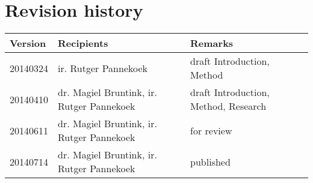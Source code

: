 \chapter*{Revision history}

\begin{tabular}{p{2cm} p{7cm} p{5cm}}
	\hline
	\bfseries{Version}\rm & \bfseries{Recipients}\rm & \bfseries{Remarks}\rm \\
	\hline
	20140324 & ir. Rutger Pannekoek & draft Introduction, Method \\
	20140410 & dr. Magiel Bruntink, ir. Rutger Pannekoek & draft Introduction,
	Method, Research
	\\
	20140611 & dr. Magiel Bruntink, ir. Rutger Pannekoek & for review \\
	20140714 & dr. Magiel Bruntink, ir. Rutger Pannekoek & published \\
	\hline
\end{tabular}
